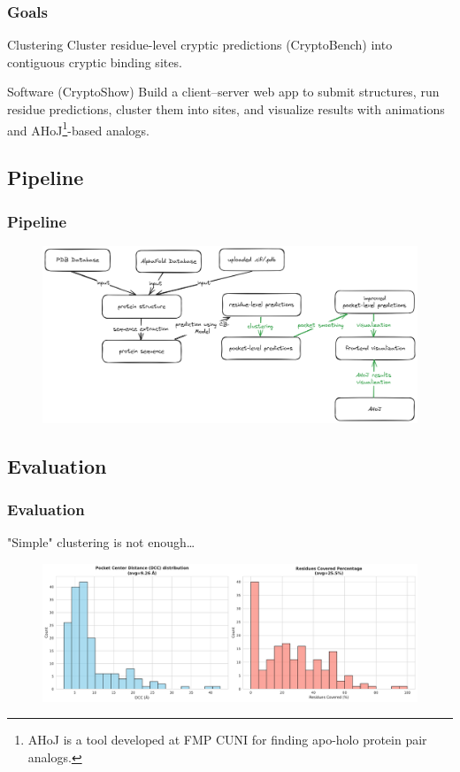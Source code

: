 \documentclass[aspectratio=169]{beamer}
\begin{document}
\begin{frame}
  \frametitle{Goals}
  \begin{block}{Clustering}
    Cluster residue-level cryptic predictions (CryptoBench) into contiguous cryptic binding sites.
  \end{block}

  \begin{block}{Software (CryptoShow)}
    Build a client–server web app to submit structures, run residue predictions, cluster them into sites, and visualize results with animations and AHoJ\footnote{AHoJ is a tool developed at FMP CUNI for finding apo-holo protein pair analogs.}-based analogs.
  \end{block}
\end{frame}

\subsection{Pipeline}

\begin{frame}
  \frametitle{Pipeline}

  \begin{figure}
    \includegraphics[width=\textwidth]{fig/pipeline.png}
  \end{figure}

\end{frame}

\subsection{Evaluation}

\begin{frame}
  \frametitle{Evaluation}

  "Simple" clustering is not enough\dots

  \begin{figure}
    \includegraphics[width=\textwidth]{fig/non-smoothened-1.pdf}
  \end{figure}
\end{frame}
\end{document}
